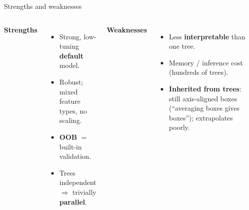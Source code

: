 \documentclass[aspectratio=169]{beamer}
\begin{document}
\begin{frame}{Strengths and weaknesses}
  \begin{columns}[T]
    \textbf{Strengths}
    \begin{itemize}\small
      \item Strong, low-tuning \textbf{default} model.
      \item Robust; mixed feature types, no scaling.
      \item \textbf{OOB} $=$ built-in validation.
      \item Trees independent $\Rightarrow$ trivially \textbf{parallel}.
    \end{itemize}
    \textbf{Weaknesses}
    \begin{itemize}\small
      \item Less \textbf{interpretable} than one tree.
      \item Memory / inference cost (hundreds of trees).
      \item \textbf{Inherited from trees}: still axis-aligned boxes (``averaging boxes
        gives boxes''); extrapolates poorly.
    \end{itemize}
  \end{columns}
  \vfill
\end{frame}
\end{document}
